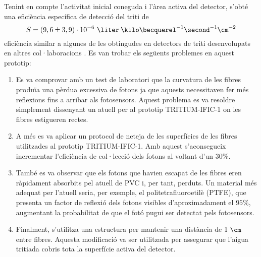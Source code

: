 Tenint en compte l'activitat inicial coneguda i l'àrea activa del detector, s'obté una eficiència específica de detecció del triti de
$$S = (9,6 \pm 3,9)\cdot{} 10^{-6}~\liter\:\kilo\becquerel^{-1}\second^{-1}\cm^{-2}$$
eficiència similar a algunes de les obtingudes en detectors de triti desenvolupats en altres col·laboracions \cite{Muramatsu, Moghissi}. Es van trobar els següents problemes en aquest prototip:

\begin{enumerate}
\item{} Es va comprovar amb un test de laboratori que la curvatura de les fibres produïa una pèrdua excessiva de fotons ja que aquests necessitaven fer més reflexions fins a arribar als fotosensors. Aquest problema es va resoldre simplement dissenyant un atuell per al prototip TRITIUM-IFIC-1 on les fibres estigueren rectes.

\item{} A més es va aplicar un protocol de neteja de les superfícies de les fibres utilitzades al prototip TRITIUM-IFIC-1. Amb aquest s'aconsegueix incrementar l'eficiència de col·lecció dels fotons al voltant d'un $30\%$.

\item{} També es va observar que els fotons que havien escapat de les fibres eren ràpidament absorbits pel atuell de PVC i, per tant, perduts. Un material més adequat per l'atuell seria, per exemple, el politetrafluoroetilè (PTFE), que presenta un factor de reflexió dels fotons visibles d'aproximadament el $95\%$, augmentant la probabilitat de que el fotó pugui ser detectat pels fotosensors.

\item{} Finalment, s'utilitza una estructura per mantenir una distància de $1~\cm$ entre fibres. Aquesta modificació va ser utilitzada per assegurar que l'aigua tritiada cobris tota la superfície activa del detector.

\end{enumerate}

